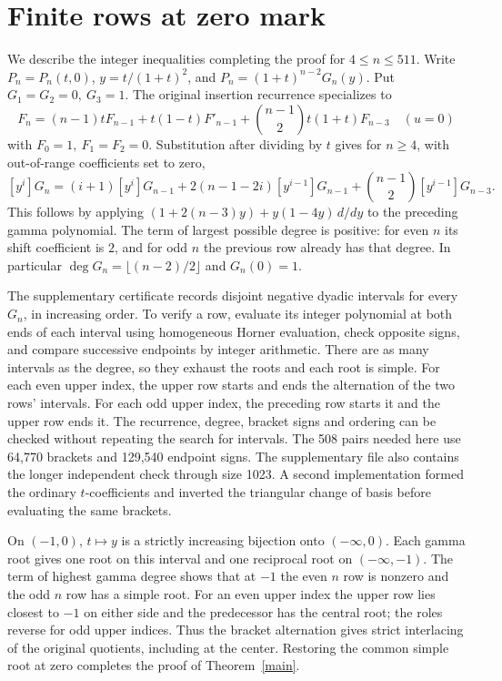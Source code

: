 \section{Finite rows at zero mark}\label{finite}
We describe the integer inequalities completing the proof for \(4\le n\le511\). Write \(P_n=P_n(t,0)\), \(y=t/(1+t)^2\), and \(P_n=(1+t)^{n-2}G_n(y)\). Put \(G_1=G_2=0,\ G_3=1\). The original insertion recurrence \cite[Theorem~30]{rr} specializes to
\[
 F_n=(n-1)tF_{n-1}+t(1-t)F'_{n-1}+
     \binom{n-1}{2}t(1+t)F_{n-3}\quad(u=0)
\]
with \(F_0=1,\ F_1=F_2=0\). Substitution after dividing by \(t\) gives for \(n\ge4\), with out-of-range coefficients set to zero,
\[
 [y^i]G_n=(i+1)[y^i]G_{n-1}
       +2(n-1-2i)[y^{i-1}]G_{n-1}
       +\binom{n-1}{2}[y^{i-1}]G_{n-3}.
\]
This follows by applying \((1+2(n-3)y)+y(1-4y)\,d/dy\) to the preceding gamma polynomial. The term of largest possible degree is positive: for even \(n\) its shift coefficient is \(2\), and for odd \(n\) the previous row already has that degree. In particular \(\deg G_n=\lfloor(n-2)/2\rfloor\) and \(G_n(0)=1\).

The supplementary certificate records disjoint negative dyadic intervals for every \(G_n\), in increasing order. To verify a row, evaluate its integer polynomial at both ends of each interval using homogeneous Horner evaluation, check opposite signs, and compare successive endpoints by integer arithmetic. There are as many intervals as the degree, so they exhaust the roots and each root is simple. For each even upper index, the upper row starts and ends the alternation of the two rows' intervals. For each odd upper index, the preceding row starts it and the upper row ends it. The recurrence, degree, bracket signs and ordering can be checked without repeating the search for intervals. The 508 pairs needed here use 64,770 brackets and 129,540 endpoint signs. The supplementary file also contains the longer independent check through size 1023. A second implementation formed the ordinary \(t\)-coefficients and inverted the triangular change of basis before evaluating the same brackets.

On \((-1,0)\), \(t\mapsto y\) is a strictly increasing bijection onto \((-\infty,0)\). Each gamma root gives one root on this interval and one reciprocal root on \((-\infty,-1)\). The term of highest gamma degree shows that at \(-1\) the even \(n\) row is nonzero and the odd \(n\) row has a simple root. For an even upper index the upper row lies closest to \(-1\) on either side and the predecessor has the central root; the roles reverse for odd upper indices. Thus the bracket alternation gives strict interlacing of the original quotients, including at the center. Restoring the common simple root at zero completes the proof of Theorem~\ref{main}.

